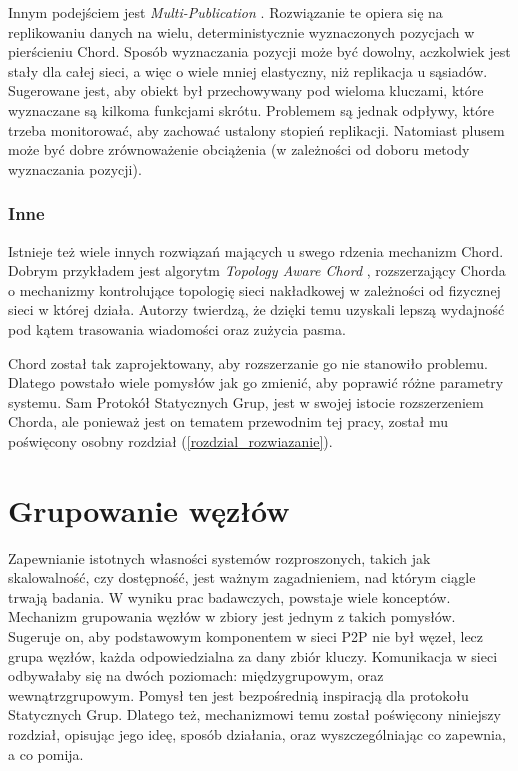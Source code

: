 \documentclass[12pt, twoside, openany]{report}
\begin{document}
Innym podejściem jest \textit{Multi-Publication} \cite{bib:paiva}. Rozwiązanie te opiera się na replikowaniu danych na wielu, deterministycznie wyznaczonych pozycjach w pierścieniu Chord. Sposób wyznaczania pozycji może być dowolny, aczkolwiek jest stały dla całej sieci, a więc o wiele mniej elastyczny, niż replikacja u sąsiadów. Sugerowane jest, aby obiekt był przechowywany pod wieloma kluczami, które wyznaczane są kilkoma funkcjami skrótu. Problemem są jednak odpływy, które trzeba monitorować, aby zachować ustalony stopień replikacji. Natomiast plusem może być dobre zrównoważenie obciążenia (w zależności od doboru metody wyznaczania pozycji).

\subsection{Inne}

Istnieje też wiele innych rozwiązań mających u swego rdzenia mechanizm Chord. Dobrym przykładem jest algorytm \textit{Topology Aware Chord} \cite{bib:tac}, rozszerzający Chorda o mechanizmy kontrolujące topologię sieci nakładkowej w zależności od fizycznej sieci w której działa. Autorzy twierdzą, że dzięki temu uzyskali lepszą wydajność pod kątem trasowania wiadomości oraz zużycia pasma.

Chord został tak zaprojektowany, aby rozszerzanie go nie stanowiło problemu. Dlatego powstało wiele pomysłów jak go zmienić, aby poprawić różne parametry systemu. Sam Protokół Statycznych Grup, jest w swojej istocie rozszerzeniem Chorda, ale ponieważ jest on tematem przewodnim tej pracy, został mu poświęcony osobny rozdział (\ref{rozdzial_rozwiazanie}).


\chapter{Grupowanie węzłów}
\label{rozdzial_grupowanie}

Zapewnianie istotnych własności systemów rozproszonych, takich jak skalowalność, czy dostępność, jest ważnym zagadnieniem, nad którym ciągle trwają badania. W wyniku prac badawczych, powstaje wiele konceptów. Mechanizm grupowania węzłów w zbiory jest jednym z takich pomysłów. Sugeruje on, aby podstawowym komponentem w sieci P2P nie był węzeł, lecz grupa węzłów, każda odpowiedzialna za dany zbiór kluczy. Komunikacja w sieci odbywałaby się na dwóch poziomach: międzygrupowym, oraz wewnątrzgrupowym. Pomysł ten jest bezpośrednią inspiracją dla protokołu Statycznych Grup. Dlatego też, mechanizmowi temu został poświęcony niniejszy rozdział, opisując jego ideę, sposób działania, oraz wyszczególniając co zapewnia, a co pomija.
\end{document}
